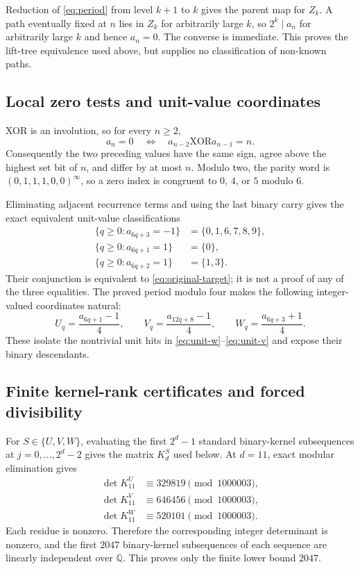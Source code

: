 \documentclass[11pt]{amsart}
\theoremstyle{definition}
\begin{document}
Reduction of \eqref{eq:period} from level $k+1$ to $k$ gives the parent map
for $Z_k$.  A path eventually fixed at $n$ lies in $Z_k$ for arbitrarily
large $k$, so $2^k\mid a_n$ for arbitrarily large $k$ and hence $a_n=0$.
The converse is immediate.  This proves the lift-tree equivalence used above,
but supplies no classification of non-known paths.

\subsection{Local zero tests and unit-value coordinates}

XOR is an involution, so for every $n\geq2$,
\begin{equation}\label{eq:adjacent-xor}
 a_n=0
 \quad\Longleftrightarrow\quad
 a_{n-2}\mathbin{\mathrm{XOR}}a_{n-1}=n.
\end{equation}
Consequently the two preceding values have the same sign, agree above the
highest set bit of $n$, and differ by at most $n$.  Modulo two, the parity
word is $(0,1,1,1,0,0)^\infty$, so a zero index is congruent to $0$, $4$,
or $5$ modulo $6$.

Eliminating adjacent recurrence terms and using the last binary carry gives
the exact equivalent unit-value classifications
\begin{align}
 \{q\geq0:a_{6q+3}=-1\}&=\{0,1,6,7,8,9\},\label{eq:unit-w}\\
 \{q\geq0:a_{6q+1}=1\}&=\{0\},\label{eq:unit-u}\\
 \{q\geq0:a_{6q+2}=1\}&=\{1,3\}.
 \label{eq:unit-v}
\end{align}
Their conjunction is equivalent to \eqref{eq:original-target}; it is not a
proof of any of the three equalities.  The proved period modulo four makes
the following integer-valued coordinates natural:
\begin{equation}\label{eq:uvw}
 U_q=\frac{a_{6q+1}-1}{4},\qquad
 V_q=\frac{a_{12q+8}-1}{4},\qquad
 W_q=\frac{a_{6q+3}+1}{4}.
\end{equation}
These isolate the nontrivial unit hits in
\eqref{eq:unit-w}--\eqref{eq:unit-v} and expose their binary descendants.

\subsection{Finite kernel-rank certificates and forced divisibility}

For $S\in\{U,V,W\}$, evaluating the first $2^d-1$ standard binary-kernel
subsequences at $j=0,\ldots,2^d-2$ gives the matrix $K_d^S$ used below.
At $d=11$, exact modular elimination gives
\begin{align*}
 \det K_{11}^U&\equiv329819\pmod{1000003},\\
 \det K_{11}^V&\equiv646456\pmod{1000003},\\
 \det K_{11}^W&\equiv520101\pmod{1000003}.
\end{align*}
Each residue is nonzero.  Therefore the corresponding integer determinant is
nonzero, and the first $2047$ binary-kernel subsequences of each sequence are
linearly independent over $\mathbb Q$.  This proves only the finite lower
bound $2047$.
\end{document}

